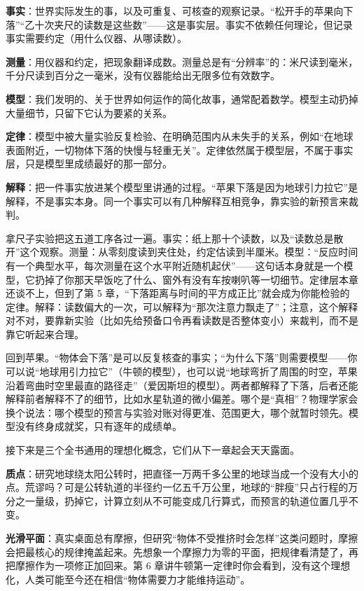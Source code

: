 \begin{mainline}
\textbf{事实}：世界实际发生的事，以及可重复、可核查的观察记录。“松开手的苹果向下落”“乙十次夹尺的读数是这些数”——这是事实层。事实不依赖任何理论，但记录事实需要约定（用什么仪器、从哪读数）。

\textbf{测量}：用仪器和约定，把现象翻译成数。测量总是有“分辨率”的：米尺读到毫米，千分尺读到百分之一毫米，没有仪器能给出无限多位有效数字。

\textbf{模型}：我们发明的、关于世界如何运作的简化故事，通常配着数学。模型主动扔掉大量细节，只留下它认为要紧的关系。

\textbf{定律}：模型中被大量实验反复检验、在明确范围内从未失手的关系，例如“在地球表面附近，一切物体下落的快慢与轻重无关”。定律依然属于模型层，不属于事实层，只是模型里成绩最好的那一部分。

\textbf{解释}：把一件事实放进某个模型里讲通的过程。“苹果下落是因为地球引力拉它”是解释，不是事实本身。同一个事实可以有几种解释互相竞争，靠实验的新预言来裁判。
\end{mainline}

拿尺子实验把这五道工序各过一遍。事实：纸上那十个读数，以及“读数总是散开”这个观察。测量：从零刻度读到夹住处，约定估读到半厘米。模型：“反应时间有一个典型水平，每次测量在这个水平附近随机起伏”——这句话本身就是一个模型，它扔掉了你那天早饭吃了什么、窗外有没有车按喇叭等一切细节。定律层本章还谈不上，但到了第 5 章，“下落距离与时间的平方成正比”就会成为你能检验的定律。解释：读数偏大的一次，可以解释为“那次注意力飘走了”；注意，这个解释对不对，要靠新实验（比如先给预备口令再看读数是否整体变小）来裁判，而不是靠它听起来合理。

回到苹果。“物体会下落”是可以反复核查的事实；“为什么下落”则需要模型——你可以说“地球用引力拉它”（牛顿的模型），也可以说“地球弯折了周围的时空，苹果沿着弯曲时空里最直的路径走”（爱因斯坦的模型）。两者都解释了下落，后者还能解释前者解释不了的细节，比如水星轨道的微小偏差。哪个是“真相”？物理学家会换个说法：哪个模型的预言与实验对账对得更准、范围更大，哪个就暂时领先。模型没有终身成就奖，只有逐年的成绩单。

接下来是三个全书通用的理想化概念，它们从下一章起会天天露面。

\textbf{质点}：研究地球绕太阳公转时，把直径一万两千多公里的地球当成一个没有大小的点。荒谬吗？可是公转轨道的半径约一亿五千万公里，地球的“胖瘦”只占行程的万分之一量级，扔掉它，计算立刻从不可能变成几行算式，而预言的轨道位置几乎不变。

\textbf{光滑平面}：真实桌面总有摩擦，但研究“物体不受推挤时会怎样”这类问题时，摩擦会把最核心的规律掩盖起来。先想象一个摩擦力为零的平面，把规律看清楚了，再把摩擦作为一项修正加回来。第 6 章讲牛顿第一定律时你会看到，没有这个理想化，人类可能至今还在相信“物体需要力才能维持运动”。


